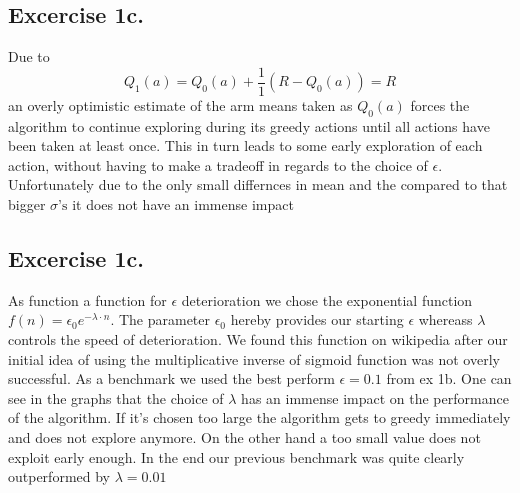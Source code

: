 \documentclass[12pt, a4paper,DIV=12, bibliography=totocnumbered]{scrartcl}
\begin{document}
\newpage
\subsection{Excercise 1c.}
Due to \[Q_1(a)=Q_0(a)+\frac{1}{1}(R-Q_0(a))=R\] an overly optimistic estimate of the arm means taken as $Q_0(a)$ 
forces the algorithm to continue exploring during its greedy actions until all actions have been taken at least once.
This in turn leads to some early exploration of each action, without having to make a tradeoff in regards to the choice of $\epsilon$. 
Unfortunately due to the only small differnces in mean and the compared to that bigger $\sigma\text{'s}$ it does not have an immense impact

\subsection{Excercise 1c.}
As function a function for $\epsilon$ deterioration we chose the exponential function $f(n)=\epsilon_0e^{-\lambda\cdot n}$. 
The parameter $\epsilon_0$ hereby provides our starting $\epsilon$ whereass $\lambda$ controls the speed of deterioration. 
We found this function on wikipedia after our initial idea of using the multiplicative inverse of sigmoid function was not overly successful.
As a benchmark we used the best perform $\epsilon=0.1$ from ex 1b. One can see in the graphs that the choice of $\lambda$ has an immense impact on the 
performance of the algorithm. If it's chosen too large the algorithm gets to greedy immediately and does not explore anymore. 
On the other hand a too small value does not exploit early enough. In the end our previous benchmark was quite clearly outperformed by $\lambda=0.01$
\end{document}
